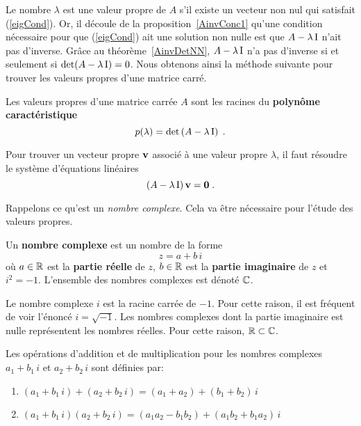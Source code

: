 {Le nombre $\lambda$ est une valeur propre de $A$ s'il existe un
vecteur non nul qui satisfait (\ref{eigCond}).  Or, il découle de la
proposition~\ref{AinvConc1} qu'une condition nécessaire pour que
(\ref{eigCond}) ait une solution non nulle est que $A - \lambda \operatorname{I}$
n'ait pas d'inverse. Grâce au théorème~\ref{AinvDetNN},
$A - \lambda \operatorname{I}$ n'a pas d'inverse si et seulement si
$\det(A -\lambda \operatorname{I})=0$.  Nous obtenons ainsi la méthode suivante pour
trouver les valeurs propres d'une matrice carré.

\begin{prop} 
Les valeurs propres d'une matrice carrée $A$ sont les racines du
{\bfseries polynôme caractéristique}
\[
p(\lambda) = \det\left(A-\lambda \operatorname{I}\right) \; .
\]

Pour trouver un vecteur propre $\mathbf{v}$ associé à une valeur propre
$\lambda$, il faut résoudre le système d'équations linéaires
\[
\left(A-\lambda \operatorname{I}\right)\mathbf{v} = \mathbf{0} \; .
\]
\end{prop}

Rappelons ce qu'est un {\em nombre complexe}.  Cela va être nécessaire
pour l'étude des valeurs propres.

\begin{defn}
Un {\bfseries nombre complexe} est un nombre de
la forme
\[
z = a+b\,i
\]
où $a \in \mathbb{R}$ est la
{\bfseries partie réelle} de $z$,
$b\in\mathbb{R}$ est la
{\bfseries partie imaginaire}
de $z$ et $i^2 = -1$.  L'ensemble des nombres complexes est dénoté
$\mathbb{C}$.
\end{defn}

Le nombre complexe $i$ est la racine carrée de $-1$.  Pour cette
raison, il est fréquent de voir l'énoncé $i = \sqrt{-1}$.  Les nombres
complexes dont la partie imaginaire est nulle représentent les nombres
réelles.  Pour cette raison, $\mathbb{R} \subset \mathbb{C}$.

\begin{defn}
Les opérations d'addition et de multiplication pour les nombres
complexes $a_1+b_1\,i$ et $a_2 + b_2\,i$ sont définies par:
\begin{enumerate}
\item $(a_1+b_1\,i) + (a_2 + b_2\,i) = (a_1+a_2)+(b_1+b_2)\,i$ 
\item $(a_1+b_1\,i)(a_2 + b_2\,i) = (a_1a_2-b_1 b_2)+(a_1 b_2+b_1 a_2)\,i$
\end{enumerate}
\end{defn}

}

